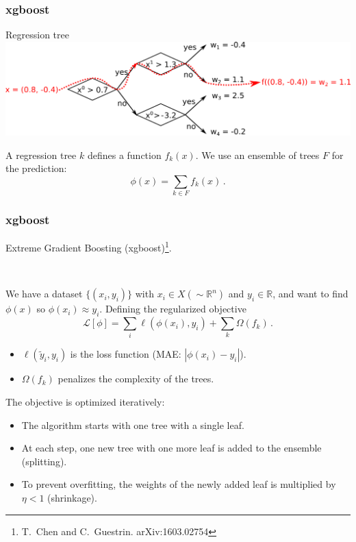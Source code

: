 \documentclass[mathserif, 10pt]{beamer}
\begin{document}
\begin{frame}
    \frametitle{xgboost}

    Regression tree
    \includegraphics[width=\textwidth]{figures/regtree.png}

    A regression tree $k$ defines a function $f_k(x)$. We use an ensemble of trees $F$ for the prediction: $$\phi(x) = \sum_{k\in F} f_k(x)\,.$$
\end{frame}

\begin{frame}
    \frametitle{xgboost}

    Extreme Gradient Boosting (xgboost)\footnote[1]{T.~Chen and C.~Guestrin. arXiv:1603.02754}.

    ~

    We have a dataset $\{(x_i, y_i)\}$ with $x_i \in X (\sim\mathbb{R}^n)$ and $y_i \in \mathbb{R}$, and want to find $\phi(x)$ so $\phi(x_i)\approx y_i$. Defining the regularized objective
    $$\mathcal{L}[\phi] = \sum_i \ell(\phi(x_i), y_i) + \sum_k \Omega(f_k)\,. $$
\begin{itemize}
    \item $\ell(\tilde{y}_i, y_i)$ is the loss function (MAE: $|\phi(x_i)-y_i|$).
    \item $\Omega(f_k)$ penalizes the complexity of the trees.
\end{itemize}
The objective is optimized iteratively:
\begin{itemize}
    \item The algorithm starts with one tree with a single leaf.
    \item At each step, one new tree with one more leaf is added to the ensemble (splitting).
    \item To prevent overfitting, the weights of the newly added leaf is multiplied by $\eta < 1$ (shrinkage).
\end{itemize}
\end{frame}
\end{document}
